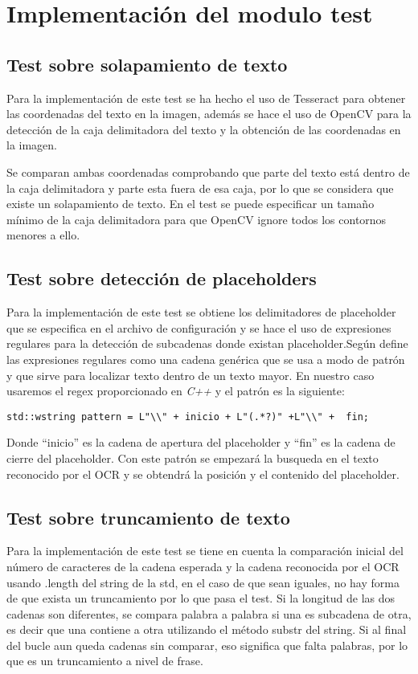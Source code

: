 \section{Implementación del modulo test}
\label{sec:Implementación de los tests}
\subsection{Test sobre solapamiento de texto}
Para la implementación de este test se ha hecho el uso de Tesseract para obtener las coordenadas del texto en la imagen, además se hace el uso de OpenCV para la detección de la caja delimitadora del texto y la obtención de las coordenadas en la imagen.

Se comparan ambas coordenadas comprobando que parte del texto está dentro de la caja delimitadora y parte esta fuera de esa caja, por lo que se considera que existe un solapamiento de texto. En el test se puede especificar un tamaño mínimo de la caja delimitadora para que OpenCV ignore todos los contornos menores a ello. 
\subsection{Test sobre detección de placeholders}
Para la implementación de este test se obtiene los delimitadores de placeholder que se especifica en el archivo de configuración y se hace el uso de expresiones regulares para la detección de subcadenas donde existan placeholder.Según \cite{Regex} define las expresiones regulares como una cadena genérica que se usa a modo de patrón y que sirve para localizar texto dentro de un texto mayor. En nuestro caso usaremos el regex proporcionado en \emph{C++} y el patrón es la siguiente:

\verb|std::wstring pattern = L"\\" + inicio + L"(.*?)" +L"\\" +  fin;|

Donde ``inicio'' es la cadena de apertura del placeholder y ``fin'' es la cadena de cierre del placeholder. 
Con este patrón se empezará la busqueda en el texto reconocido por el OCR y se obtendrá la posición y el contenido del placeholder.


\subsection{Test sobre truncamiento de texto}
Para la implementación de este test se tiene en cuenta la comparación inicial del número de caracteres de la cadena esperada y la cadena reconocida por el OCR usando .length del string de la std, en el caso de que sean iguales, no hay forma de que exista un truncamiento por lo que pasa el test.
Si la longitud de las dos cadenas son diferentes, se compara palabra a palabra si una es subcadena de otra, es decir que una contiene a otra utilizando el método substr del string.
Si al final del bucle aun queda cadenas sin comparar, eso significa que falta palabras, por lo que es un truncamiento a nivel de frase.

